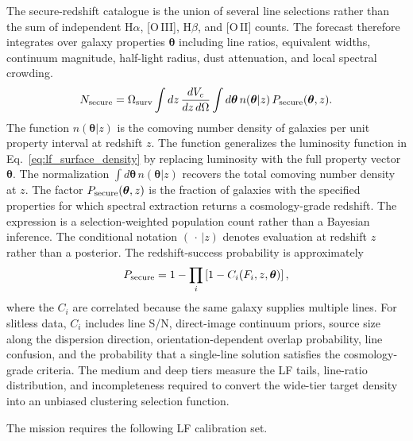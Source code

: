 The secure-redshift catalogue is the union of several line selections rather than the sum of independent H$\alpha$, [O\,III], H$\beta$, and [O\,II] counts. The forecast therefore integrates over galaxy properties $\boldsymbol{\theta}$ including line ratios, equivalent widths, continuum magnitude, half-light radius, dust attenuation, and local spectral crowding.
\begin{equation}
  N_{\rm secure} =
  \Omega_{\rm surv}
  \int dz\,\frac{dV_c}{dz\,d\Omega}
  \int d\boldsymbol{\theta}\,
  n(\boldsymbol{\theta}|z)\,
  P_{\rm secure}(\boldsymbol{\theta},z).
\end{equation}
The function $n(\boldsymbol{\theta}|z)$ is the comoving number density of galaxies per unit property interval at redshift $z$. The function generalizes the luminosity function in Eq.~\eqref{eq:lf_surface_density} by replacing luminosity with the full property vector $\boldsymbol{\theta}$. The normalization $\int d\boldsymbol{\theta}\,n(\boldsymbol{\theta}|z)$ recovers the total comoving number density at $z$. The factor $P_{\rm secure}(\boldsymbol{\theta},z)$ is the fraction of galaxies with the specified properties for which spectral extraction returns a cosmology-grade redshift. The expression is a selection-weighted population count rather than a Bayesian inference. The conditional notation $(\,\cdot\,|z)$ denotes evaluation at redshift $z$ rather than a posterior. The redshift-success probability is approximately
\begin{equation}
  P_{\rm secure}=1-\prod_i
  \left[1-C_i(F_i,z,\boldsymbol{\theta})\right],
\end{equation}
where the $C_i$ are correlated because the same galaxy supplies multiple lines. For slitless data, $C_i$ includes line S/N, direct-image continuum priors, source size along the dispersion direction, orientation-dependent overlap probability, line confusion, and the probability that a single-line solution satisfies the cosmology-grade criteria. The medium and deep tiers measure the LF tails, line-ratio distribution, and incompleteness required to convert the wide-tier target density into an unbiased clustering selection function.

The mission requires the following LF calibration set.

